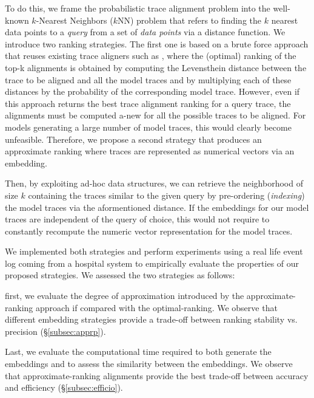 To do this, we frame the probabilistic trace alignment problem into the well-known $k$-Nearest Neighbors ($k$NN) problem \cite{Altman} that refers to finding the $k$ nearest data points to a \textit{query}  from a set  of \textit{data points} via a distance function.
We introduce two ranking strategies. The first one is based on a brute force approach that reuses existing trace aligners such as \cite{DBLP:conf/edoc/AdriansyahDA11,LeoniM17}, where the (optimal) ranking of the top-k alignments is obtained by computing the Levensthein distance between the trace to be aligned and all the model traces and by multiplying each of these distances by the probability of the corresponding model trace. However, even if this approach returns the best trace alignment ranking for a query trace, the alignments must be computed a-new for all the possible traces to be aligned. For models generating a large number of model traces, this would clearly become unfeasible. Therefore, we propose a second strategy that produces an approximate ranking where traces are represented as numerical vectors via an embedding. {Then, by exploiting ad-hoc data structures,
	we can retrieve the neighborhood of size $k$ containing the traces similar to the given query  by pre-ordering (\textit{indexing}) the model traces  via the aformentioned distance.
	If the embeddings for our model traces are independent of the query of choice, this would not require to constantly recompute the numeric vector representation for the model traces.
	
	We implemented both strategies and perform experiments using a real life event log coming from a hospital system to empirically evaluate the properties of our proposed strategies. We assessed the two strategies as follows:
\begin{mylist}
	\item first, we evaluate the degree of approximation introduced by the approximate-ranking approach if compared with the optimal-ranking. We observe that different embedding strategies provide a trade-off between ranking stability vs. precision (\S\ref{subsec:apprp}).
	\item Last, we evaluate the computational time required to both generate the embeddings and to assess the similarity between the embeddings. We observe that approximate-ranking alignments provide the best trade-off between accuracy and efficiency (\S\ref{subsec:efficio}).
\end{mylist}

}
